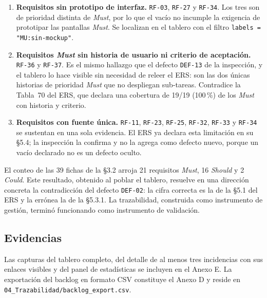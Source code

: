 \documentclass[11pt,letterpaper]{article}
\begin{document}
\begin{enumerate}[leftmargin=*, nosep]
  \item \textbf{Requisitos sin prototipo de interfaz.} \texttt{RF-03}, \texttt{RF-27} y
        \texttt{RF-34}. Los tres son de prioridad distinta de \emph{Must}, por lo que el vacío no
        incumple la exigencia de prototipar las pantallas \emph{Must}. Se localizan en el tablero
        con el filtro \texttt{labels = "MU:sin-mockup"}.
  \item \textbf{Requisitos \emph{Must} sin historia de usuario ni criterio de aceptación.}
        \texttt{RF-36} y \texttt{RF-37}. Es el mismo hallazgo que el defecto \texttt{DEF-13} de la
        inspección, y el tablero lo hace visible sin necesidad de releer el ERS: son las dos únicas
        historias de prioridad \emph{Must} que no despliegan sub-tareas. Contradice la Tabla~70 del
        ERS, que declara una cobertura de 19/19 (100\,\%) de los \emph{Must} con historia y
        criterio.
  \item \textbf{Requisitos con fuente única.} \texttt{RF-11}, \texttt{RF-23}, \texttt{RF-25},
        \texttt{RF-32}, \texttt{RF-33} y \texttt{RF-34} se sustentan en una sola evidencia. El ERS
        ya declara esta limitación en su \S5.4; la inspección la confirma y no la agrega como
        defecto nuevo, porque un vacío declarado no es un defecto oculto.
\end{enumerate}

\noindent
El conteo de las 39 fichas de la \S3.2 arroja 21 requisitos \emph{Must}, 16 \emph{Should} y 2
\emph{Could}. Este resultado, obtenido al poblar el tablero, resuelve en una dirección concreta la
contradicción del defecto \texttt{DEF-02}: la cifra correcta es la de la \S5.1 del ERS y la
errónea la de la \S5.3.1. La trazabilidad, construida como instrumento de gestión, terminó
funcionando como instrumento de validación.

\subsection*{Evidencias}

Las capturas del tablero completo, del detalle de al menos tres incidencias con sus enlaces visibles
y del panel de estadísticas se incluyen en el Anexo E. La exportación del backlog en formato CSV
constituye el Anexo D y reside en \texttt{04\_Trazabilidad/backlog\_export.csv}.

\end{document}
